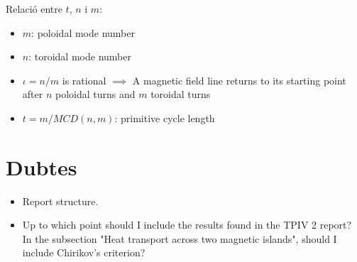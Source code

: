 Relació entre $t$, $n$ i $m$:
\begin{itemize}
    \item $m$: poloidal mode number
    \item $n$: toroidal mode number
    \item $\iota=n/m$ is rational $\implies$ A magnetic field line returns to its starting point after $n$ poloidal turns and $m$ toroidal turns
    \item $t=m/MCD(n,m)$: primitive cycle length
\end{itemize}

\section{Dubtes}
\begin{itemize}
    \item Report structure.
    \item Up to which point should I include the results found in the TPIV 2 report? In the subsection "Heat transport across two magnetic islands", should I include Chirikov's criterion?
\end{itemize}